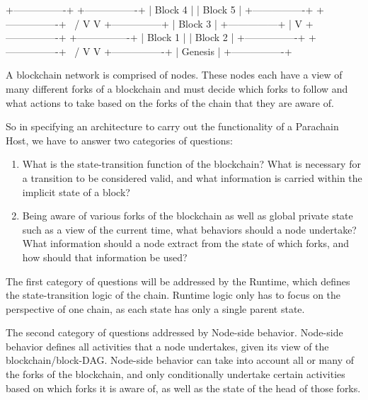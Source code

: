 \begin{verbnobox}[\small]
+----------------+     +----------------+
|    Block 4     |     | Block 5        |
+----------------+     +----------------+
               \           /
                V         V
            +---------------+
            |    Block 3    |
            +---------------+
                    |
                    V
            +----------------+     +----------------+
            |    Block 1     |     |   Block 2      |
            +----------------+     +----------------+
                       \            /
                        V          V
                    +----------------+
                    |    Genesis     |
                    +----------------+
\end{verbnobox}

A blockchain network is comprised of nodes. These nodes each have a view of many
different forks of a blockchain and must decide which forks to follow and what
actions to take based on the forks of the chain that they are aware of.
\newline

So in specifying an architecture to carry out the functionality of a Parachain
Host, we have to answer two categories of questions:

\begin{enumerate}
    \item What is the state-transition function of the blockchain? What is
    necessary for a transition to be considered valid, and what information is
    carried within the implicit state of a block?
    \item Being aware of various forks of the blockchain as well as global
    private state such as a view of the current time, what behaviors should a
    node undertake? What information should a node extract from the state of
    which forks, and how should that information be used?
\end{enumerate}

The first category of questions will be addressed by the Runtime, which defines
the state-transition logic of the chain. Runtime logic only has to focus on the
perspective of one chain, as each state has only a single parent state.
\newline

The second category of questions addressed by Node-side behavior. Node-side
behavior defines all activities that a node undertakes, given its view of the
blockchain/block-DAG. Node-side behavior can take into account all or many of
the forks of the blockchain, and only conditionally undertake certain activities
based on which forks it is aware of, as well as the state of the head of those
forks.

